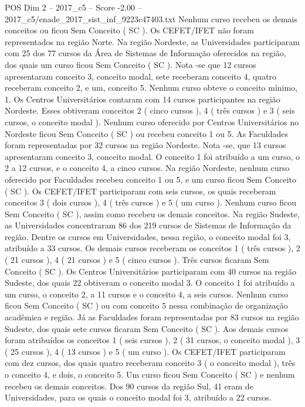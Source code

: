 \begin{textsample}{POS Dim 2 – 2017\_c5 – Score -2.00 – 2017\_c5/enade\_2017\_sist\_inf\_9223c47403.txt}
Nenhum curso recebeu os demais conceitos ou ficou Sem Conceito ( SC ).
Os CEFET/IFET não foram representados na região Norte.
Na região Nordeste, as Universidades participaram com 25 dos 77 cursos da Área de Sistemas de Informação oferecidos na região, dos quais um curso ficou Sem Conceito ( SC ).
Nota -se que 12 cursos apresentaram conceito 3, conceito modal, sete receberam conceito 4, quatro receberam conceito 2, e um, conceito 5.
Nenhum curso obteve o conceito mínimo, 1.
Os Centros Universitários contaram com 14 cursos participantes na região Nordeste.
Esses obtiveram conceitos 2 ( cinco cursos ), 4 ( três cursos ) e 3 ( seis cursos, o conceito modal ).
Nenhum curso oferecido por Centros Universitários no Nordeste ficou Sem Conceito ( SC ) ou recebeu conceito 1 ou 5.
As Faculdades foram representadas por 32 cursos na região Nordeste.
Nota -se, que 13 cursos apresentaram conceito 3, conceito modal.
O conceito 1 foi atribuído a um curso, o 2 a 12 cursos, e o conceito 4, a cinco cursos.
Na região Nordeste, nenhum curso oferecido por Faculdades recebeu conceito 1 ou 5, e um curso ficou Sem Conceito ( SC ).
Os CEFET/IFET participaram com seis cursos, os quais receberam conceitos 3 ( dois cursos ), 4 ( três cursos ) e 5 ( um curso ).
Nenhum curso ficou Sem Conceito ( SC ), assim como recebeu os demais conceitos.
Na região Sudeste, as Universidades concentraram 86 dos 219 cursos de Sistemas de Informação da região.
Dentre os cursos em Universidades, nessa região, o conceito modal foi 3, atribuído a 33 cursos.
Os demais cursos receberam os conceitos 1 ( três cursos ), 2 ( 21 cursos ), 4 ( 21 cursos ) e 5 ( cinco cursos ).
Três cursos ficaram Sem Conceito ( SC ).
Os Centros Universitários participaram com 40 cursos na região Sudeste, dos quais 22 obtiveram o conceito modal 3.
O conceito 1 foi atribuído a um curso, o conceito 2, a 11 cursos e o conceito 4, a seis cursos.
Nenhum curso ficou Sem Conceito ( SC ) ou com conceito 5 nessa combinação de organização acadêmica e região.
Já as Faculdades foram representadas por 83 cursos na região Sudeste, dos quais sete cursos ficaram Sem Conceito ( SC ).
Aos demais cursos foram atribuídos os conceitos 1 ( seis cursos ), 2 ( 31 cursos, o conceito modal ), 3 ( 25 cursos ), 4 ( 13 cursos ) e 5 ( um curso ).
Os CEFET/IFET participaram com dez cursos, dos quais quatro receberam conceito 3 ( o conceito modal ), três o conceito 4, e dois, o conceito 5.
Um curso ficou Sem Conceito ( SC ) e nenhum recebeu os demais conceitos.
Dos 90 cursos da região Sul, 41 eram de Universidades, para os quais o conceito modal foi 3, atribuído a 22 cursos.

\end{textsample}
